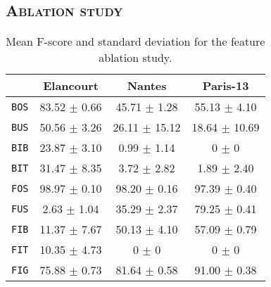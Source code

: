     \subsection{\textsc{Ablation study}}
        \begin{table}
            \footnotesize
            \begin{tabular}{c c c c}
                \toprule
                & \textbf{Elancourt} & \textbf{Nantes} & \textbf{Paris-13}\\
                \midrule
                \texttt{BOS} & 83.52 $\pm$ 0.66 & 45.71 $\pm$ 1.28 & 55.13 $\pm$ 4.10 \\
                \midrule
                \texttt{BUS} & 50.56 $\pm$ 3.26 & 26.11 $\pm$ 15.12 & 18.64 $\pm$ 10.69 \\
                \midrule
                \texttt{BIB} & 23.87 $\pm$ 3.10 & 0.99 $\pm$ 1.14 & 0 $\pm$ 0 \\
                \midrule
                \texttt{BIT} & 31.47 $\pm$ 8.35 & 3.72 $\pm$ 2.82 & 1.89 $\pm$ 2.40 \\
                \midrule
                \midrule
                \texttt{FOS} & 98.97 $\pm$ 0.10 & 98.20 $\pm$ 0.16 & 97.39 $\pm$ 0.40 \\
                \midrule
                \texttt{FUS} & 2.63 $\pm$ 1.04 & 35.29 $\pm$ 2.37 & 79.25 $\pm$ 0.41 \\
                \midrule
                \texttt{FIB} & 11.37 $\pm$ 7.67 & 50.13 $\pm$ 4.10 & 57.09 $\pm$ 0.79 \\
                \midrule
                \texttt{FIT} & 10.35 $\pm$ 4.73 & 0 $\pm$ 0 & 0 $\pm$ 0 \\
                \midrule
                \texttt{FIG} & 75.88 $\pm$ 0.73 & 81.64 $\pm$ 0.58 & 91.00 $\pm$ 0.38 \\
                \bottomrule
            \end{tabular}
            \caption{\label{tab::f_score_ablation_f3} Mean F-score and standard deviation for the feature ablation study.}
        \end{table}
